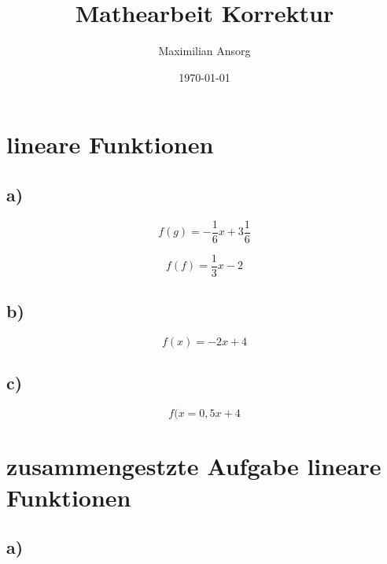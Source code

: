 \documentclass[a4paper,12pt]{scrartcl}
\title{Mathearbeit Korrektur}
\author{Maximilian Ansorg}
\date{\today}
\begin{document}
\maketitle

\section{lineare Funktionen}

\subsection*{a)}

\[f(g)=-\frac{1}{6}x+3\frac{1}{6}\]

\[f(f)=\frac{1}{3}x-2\]

\subsection*{b)}

\[f(x)=-2x+4\]

\subsection*{c)}

\[f(x=0,5x+4\]

\section*{zusammengestzte Aufgabe lineare Funktionen}

\subsection*{a)}
\end{document}
